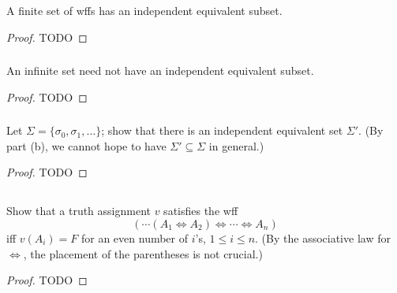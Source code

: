 \documentclass{report}
\begin{document}
\subsubsection{}%

  A finite set of wffs has an independent equivalent subset.

  \begin{proof}
    TODO
  \end{proof}

\subsubsection{}%

  An infinite set need not have an independent equivalent subset.

  \begin{proof}
    TODO
  \end{proof}

\subsubsection{}%

  Let $\Sigma = \{\sigma_0, \sigma_1, \ldots\}$; show that there is an
    independent equivalent set $\Sigma'$.
  (By part (b), we cannot hope to have $\Sigma' \subseteq \Sigma$ in general.)

  \begin{proof}
    TODO
  \end{proof}

\subsection{}%

  Show that a truth assignment $v$ satisfies the wff
    $$(\cdots (A_1 \Leftrightarrow A_2)
      \Leftrightarrow \cdots \Leftrightarrow A_n)$$
    iff $v(A_i) = F$ for an even number of $i$'s, $1 \leq i \leq n$.
  (By the associative law for $\Leftrightarrow$, the placement of the
    parentheses is not crucial.)

  \begin{proof}
    TODO
  \end{proof}

\subsection{}%
\end{document}
